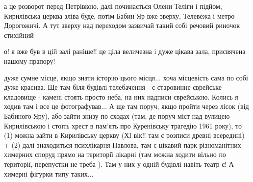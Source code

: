 
















а це розворот перед Петрівкою, далі починається Олени Теліги і підйом,
Кирилівська церква зліва буде, потім Бабин Яр вже зверху, Телевежа і метро
Дорогожичі. А тут зверху над переходом зазвичай такий собі речовий риночок
стихійний

о! я вже був в цій залі раніше!! це ціла величезна і дуже цікава зала,
присвячена нашому прапору! 

дуже сумне місце, якщо знати історію цього місця... хоча місцевість сама по
собі дуже красива. Ще там біля будівлі телебачення - є старовинне єврейське
кладовище - камені стоять просто неба, на них надписи єврейською. 
Колись я ходив там і все це фотографував... А ще там поруч, якщо пройти через лісок (від Бабиного Яру),
або зайти знизу по сходах (там, де поруч міст над вулицею Кирилівською і стоїть
хрест в пам'ять про Куренівську трагедію 1961 року), то (1) можна зайти в
Кирилівську церкву (ХІ вік!! там є розписи древні всередині) + (2) далі
знаходиться психлікарня Павлова, там є цікавий парк різноманітних химерних
споруд прямо на території лікарні (там можна ходити вільно по території,
перепустки не треба ). Там у них у одній будівлі навіть театр є! А химерні
фігурки типу таких... 

